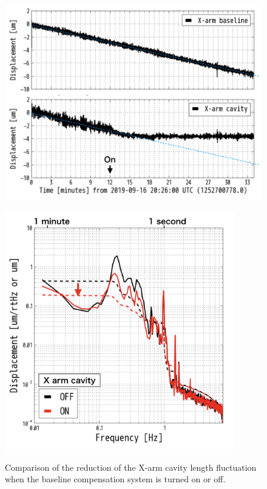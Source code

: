 \begin{figure}[p]
  \begin{minipage}{15cm}
    \begin{center}   
      \includegraphics[width=12cm]{./img_chap6/img610.png}
      \label{img:img610} \hfill\vspace{10pt}
    \end{center}
  \end{minipage}
  \begin{minipage}{15cm}
    \begin{center}   
      \includegraphics[width=10cm]{./img_chap6/img611.png}
      \label{img:img611}
    \end{center}
  \end{minipage}
  \caption{Comparison of the reduction of the X-arm cavity length fluctuation when the baseline compensation system is turned on or off.}{}
\end{figure}




